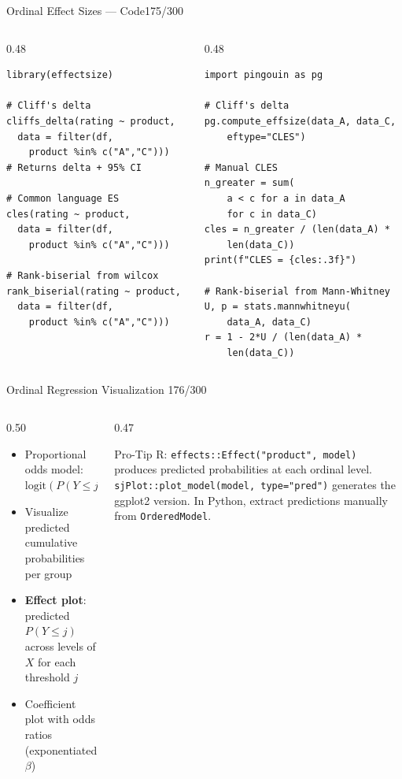 \documentclass[10pt]{beamer}
\newcommand{\smark}[1]{\hfill{\scriptsize\color{codegray}#1}}
\begin{document}
\begin{frame}[fragile]{Ordinal Effect Sizes --- Code}\smark{175/300}
\begin{columns}[T]
\begin{column}{0.48\textwidth}
\begin{lstlisting}[style=Rstyle]
library(effectsize)

# Cliff's delta
cliffs_delta(rating ~ product,
  data = filter(df,
    product %in% c("A","C")))
# Returns delta + 95% CI

# Common language ES
cles(rating ~ product,
  data = filter(df,
    product %in% c("A","C")))

# Rank-biserial from wilcox
rank_biserial(rating ~ product,
  data = filter(df,
    product %in% c("A","C")))
\end{lstlisting}
\end{column}
\begin{column}{0.48\textwidth}
\begin{lstlisting}[style=Pystyle]
import pingouin as pg

# Cliff's delta
pg.compute_effsize(data_A, data_C,
    eftype="CLES")

# Manual CLES
n_greater = sum(
    a < c for a in data_A
    for c in data_C)
cles = n_greater / (len(data_A) *
    len(data_C))
print(f"CLES = {cles:.3f}")

# Rank-biserial from Mann-Whitney
U, p = stats.mannwhitneyu(
    data_A, data_C)
r = 1 - 2*U / (len(data_A) *
    len(data_C))
\end{lstlisting}
\end{column}
\end{columns}
\end{frame}

\begin{frame}{Ordinal Regression Visualization}
\smark{176/300}
\begin{columns}[T]
\begin{column}{0.50\textwidth}
\begin{itemize}
    \item Proportional odds model: $\text{logit}(P(Y \leq j)) = \alpha_j - \beta X$
    \item Visualize predicted cumulative probabilities per group
    \item \textbf{Effect plot}: predicted $P(Y \leq j)$ across levels of $X$ for each threshold $j$
    \item Coefficient plot with odds ratios (exponentiated $\beta$)
\end{itemize}
\end{column}
\begin{column}{0.47\textwidth}
\begin{alertblock}{Pro-Tip}
    \scriptsize R: \texttt{effects::Effect("product", model)} produces predicted probabilities at each ordinal level. \texttt{sjPlot::plot\_model(model, type="pred")} generates the ggplot2 version. In Python, extract predictions manually from \texttt{OrderedModel}.
\end{alertblock}
\end{column}
\end{columns}
\end{frame}
\end{document}
